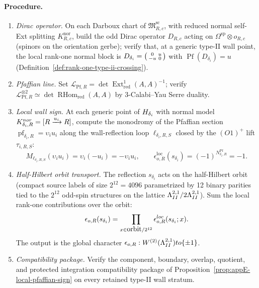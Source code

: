 \paragraph{Procedure.}
\begin{enumerate}
\item \emph{Dirac operator.}  On each Darboux chart of
\(\mathfrak M^{\mathrm{sc}}_{R,c}\), with reduced normal self-Ext
splitting \(K^{\mathrm{nor}}_{R,c}\), build the odd Dirac operator
\(D_{R,c}\) acting on \(\Omega^{\mathrm{sp}}\otimes o_{R,c}\)
(spinors on the orientation gerbe); verify that, at a generic
type-II wall point, the local rank-one normal block is
\(D_{\delta_i}=\begin{psmallmatrix}0&u\\-u&0\end{psmallmatrix}\) with
\(\operatorname{Pf}(D_{\delta_i})=u\)
(Definition~\ref{def:rank-one-type-ii-crossing}).

\item \emph{Pfaffian line.}  Set
\(\mathscr L_{\mathrm{Pf},R}=
\det\operatorname{Ext}^1_{\mathrm{red}}(A,A)^{-1}\); verify
\(\mathscr L_{\mathrm{Pf},R}^{\otimes 2}\simeq
\det\operatorname{RHom}_{\mathrm{red}}(A,A)\) by
\(3\)-Calabi--Yau Serre duality.

\item \emph{Local wall sign.}  At each generic point of
\(\Hpl_{\delta_i}\) with normal model
\(K^{\mathrm{nor}}_{\delta_i,R}=[\R\xrightarrow{u_i}\R]\), compute
the monodromy of the Pfaffian section
\(\operatorname{pf}_{\delta_i,R}=\upsilon_iu_i\) along the
wall-reflection loop \(\ell_{\delta_i,R,S}\) closed by the
\((O1)^+\) lift \(\tau_{i,R,S}\):
\[
M_{\ell_{\delta_i,R,S}}(\upsilon_iu_i)
=\upsilon_i(-u_i)=-\upsilon_iu_i,
\qquad
\epsilon_{o,R}^{\mathrm{loc}}(s_{\delta_i})
=(-1)^{N^{\mathrm{Pf}}_{\delta_i,R}}=-1.
\]

\item \emph{Half-Hilbert orbit transport.}  The reflection
\(s_{\delta_i}\) acts on the half-Hilbert orbit (compact source labels
of size \(2^{12}=4096\) parametrized by 12 binary parities tied to the
\(2^{12}\) odd-spin structures on the lattice
\(\La^{2,1}_{II}/2\La^{2,1}_{II}\)).  Sum the local rank-one
contributions over the orbit:
\[
\epsilon_{o,R}(s_{\delta_i})
=\prod_{x\in\hbox{orbit}/2^{12}}
\epsilon_{o,R}^{\mathrm{loc}}(s_{\delta_i};x).
\]
The output is the global character
\(\epsilon_{o,R}:W^{(2)}(\La^{2,1}_{II})\to\{\pm 1\}\).

\item \emph{Compatibility package.}  Verify the component, boundary,
overlap, quotient, and protected integration compatibility package of
Proposition~\ref{prop:appE-local-pfaffian-sign} on every
retained type-II wall stratum.


\end{enumerate}
